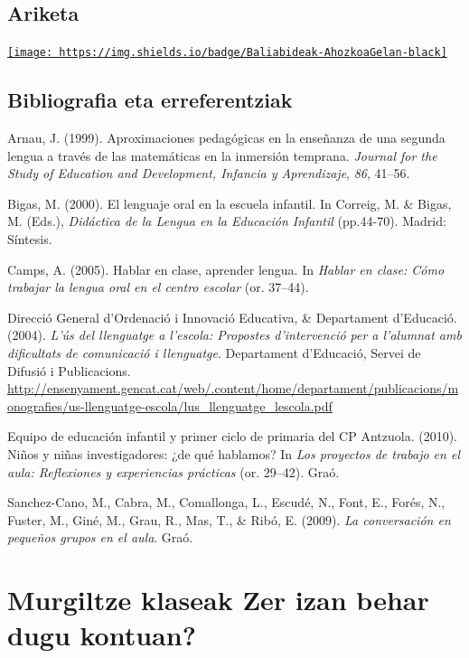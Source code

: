 \documentclass[
]{book}
\begin{document}
\hypertarget{ariketa}{%
\section*{Ariketa}\label{ariketa}}

\href{../Baliabideak/05_ahozko_hizkuntza/Ahozkoa_eskolan-Lantzekoak.pdf}{\texttt{[image: https://img.shields.io/badge/Baliabideak-AhozkoaGelan-black]}}

\hypertarget{bibliografia-eta-erreferentziak}{%
\section*{Bibliografia eta erreferentziak}\label{bibliografia-eta-erreferentziak}}

Arnau, J. (1999). Aproximaciones pedagógicas en la enseñanza de una segunda lengua a través de las matemáticas en la inmersión temprana. \emph{Journal for the Study of Education and Development, Infancia y Aprendizaje}, \emph{86}, 41--56.

Bigas, M. (2000). El lenguaje oral en la escuela infantil. In Correig, M. \& Bigas, M. (Eds.), \emph{Didáctica de la Lengua en la Educación Infantil} (pp.44-70). Madrid: Síntesis.

Camps, A. (2005). Hablar en clase, aprender lengua. In \emph{Hablar en clase: Cómo trabajar la lengua oral en el centro escolar} (or. 37--44).

Direcció General d'Ordenació i Innovació Educativa, \& Departament d'Educació. (2004). \emph{L'ús del llenguatge a l'escola: Propostes d'intervenció per a l'alumnat amb dificultats de comunicació i llenguatge}. Departament d'Educació, Servei de Difusió i Publicacions. \url{http://ensenyament.gencat.cat/web/.content/home/departament/publicacions/monografies/us-llenguatge-escola/lus_llenguatge_lescola.pdf}

Equipo de educación infantil y primer ciclo de primaria del CP Antzuola. (2010). Niños y niñas investigadores: ¿de qué hablamos? In \emph{Los proyectos de trabajo en el aula: Reflexiones y experiencias prácticas} (or. 29--42). Graó.

Sanchez-Cano, M., Cabra, M., Comallonga, L., Escudé, N., Font, E., Forés, N., Fuster, M., Giné, M., Grau, R., Mas, T., \& Ribó, E. (2009). \emph{La conversación en pequeños grupos en el aula}. Graó.

\hypertarget{murgiltze-klaseak-zer-izan-behar-dugu-kontuan}{%
\chapter{\texorpdfstring{Murgiltze klaseak Zer izan behar dugu kontuan?}{Murgiltze klaseak  Zer izan behar dugu kontuan?}}\label{murgiltze-klaseak-zer-izan-behar-dugu-kontuan}}
\end{document}
